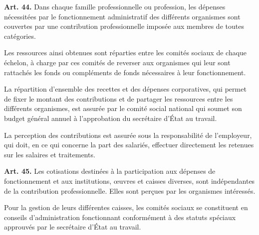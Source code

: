 \documentclass[french,twoside]{book} %
\newcommand{\labelchar}[1]{\textbf{\color{rubric} #1}}
\def\mednobreak{\ifdim\lastskip<\medskipamount
  \removelastskip\nopagebreak\medskip\fi}
\newcommand{\labelblock}[1]{\medbreak{\noindent\color{rubric}\bfseries #1}\par\mednobreak}
\begin{document}
\noindent \labelchar{Art. 44.} Dans chaque famille professionnelle ou profession, les dépenses nécessitées par le fonctionnement administratif des différents organismes sont couvertes par une contribution professionnelle imposée aux membres de toutes catégories.\par
Les ressources ainsi obtenues sont réparties entre les comités sociaux de chaque échelon, à charge par ces comités de reverser aux organismes qui leur sont rattachés les fonds ou compléments de fonds nécessaires à leur fonctionnement.\par
La répartition d’ensemble des recettes et des dépenses corporatives, qui permet de fixer le montant des contributions et de partager les ressources entre les différents organismes, est assurée par le comité social national qui soumet son budget général annuel à l’approbation du secrétaire d’État au travail.\par
La perception des contributions est assurée sous la responsabilité de l’employeur, qui doit, en ce qui concerne la part des salariés, effectuer directement les retenues sur les salaires et traitements.\par
\bigbreak
\noindent \labelchar{Art. 45.} Les cotisations destinées à la participation aux dépenses de fonctionnement et aux institutions, œuvres et caisses diverses, sont indépendantes de la contribution professionnelle. Elles sont perçues par les organismes intéressés.\par
Pour la gestion de leurs différentes caisses, les comités sociaux se constituent en conseils d’administration fonctionnant conformément à des statuts spéciaux approuvés par le secrétaire d’État au travail.\par

\labelblock{Le patrimoine corporatif commun}
\end{document}
